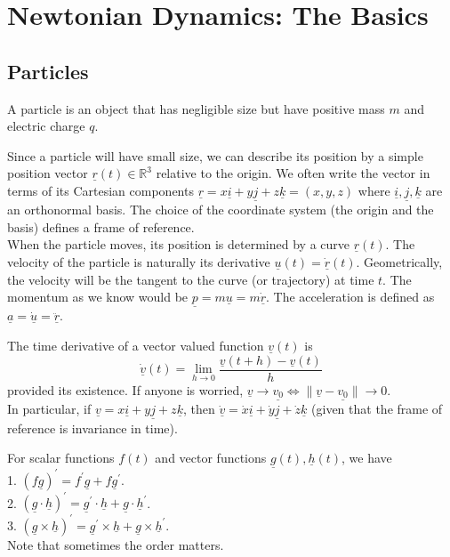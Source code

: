 \section{Newtonian Dynamics: The Basics}
\subsection{Particles}
\begin{definition}
    A particle is an object that has negligible size but have positive mass $m$ and electric charge $q$.
\end{definition}
Since a particle will have small size, we can describe its position by a simple position vector $\underline{r}(t)\in\mathbb R^3$ relative to the origin.
We often write the vector in terms of its Cartesian components $\underline{r}=x\underline{i}+y\underline{j}+z\underline{k}=(x,y,z)$ where $\underline{i},\underline{j},\underline{k}$ are an orthonormal basis.
The choice of the coordinate system (the origin and the basis) defines a frame of reference.\\
When the particle moves, its position is determined by a curve $\underline{r}(t)$.
The velocity of the particle is naturally its derivative $\underline{u}(t)=\underline{\dot{r}}(t)$.
Geometrically, the velocity will be the tangent to the curve (or trajectory) at time $t$.
The momentum as we know would be $\underline{p}=m\underline{u}=m\underline{\dot{r}}$.
The acceleration is defined as $\underline{a}=\underline{\dot{u}}=\underline{\ddot{r}}$.
\begin{note}
    The time derivative of a vector valued function $\underline{v}(t)$ is
    $$\underline{\dot{v}}(t)=\lim_{h\to0}\frac{\underline{v}(t+h)-\underline{v}(t)}{h}$$
    provided its existence.
    If anyone is worried, $\underline{v}\to\underline{v_0}\iff\|\underline{v}-\underline{v_0}\|\to 0$.\\
    In particular, if $\underline{v}=x\underline{i}+y\underline{j}+z\underline{k}$, then $\underline{\dot{v}}=\dot{x}\underline{i}+\dot{y}\underline{j}+\dot{z}\underline{k}$ (given that the frame of reference is invariance in time).
\end{note}
\begin{proposition}
    For scalar functions $f(t)$ and vector functions $\underline{g}(t),\underline{h}(t)$, we have\\
    1. $(f\underline{g})^\prime=f^\prime \underline{g}+f\underline{g}^\prime$.\\
    2. $(\underline{g}\cdot\underline{h})^\prime=\underline{g}^\prime\cdot\underline{h}+\underline{g}\cdot\underline{h}^\prime$.\\
    3. $(\underline{g}\times\underline{h})^\prime=\underline{g}^\prime\times\underline{h}+\underline{g}\times\underline{h}^\prime$.\\
    Note that sometimes the order matters.
\end{proposition}
